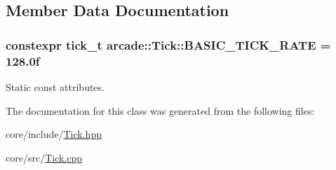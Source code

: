 \subsection{Member Data Documentation}
\hypertarget{classarcade_1_1_tick_a66eaf47b57193a8dd35e78c93e55c23b}{
\subsubsection[{B\-A\-S\-I\-C\-\_\-\-T\-I\-C\-K\-\_\-\-R\-A\-T\-E}]{\setlength{\rightskip}{0pt plus 5cm}constexpr {\bf tick\-\_\-t} arcade\-::\-Tick\-::\-B\-A\-S\-I\-C\-\_\-\-T\-I\-C\-K\-\_\-\-R\-A\-T\-E = 128.\-0f\hspace{0.3cm}{\ttfamily [static]}}}\label{classarcade_1_1_tick_a66eaf47b57193a8dd35e78c93e55c23b}


Static const attributes. 



The documentation for this class was generated from the following files\-:\begin{DoxyCompactItemize}
\item 
core/include/\hyperlink{_tick_8hpp}{Tick.\-hpp}\item 
core/src/\hyperlink{_tick_8cpp}{Tick.\-cpp}\end{DoxyCompactItemize}

